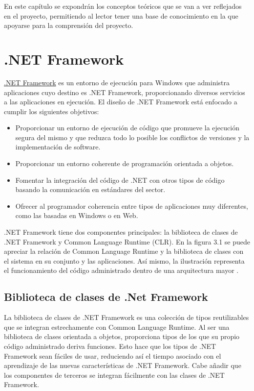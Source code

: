 
En este capítulo se expondrán los conceptos teóricos que se van a ver reflejados en el proyecto, permitiendo al lector tener una base de conocimiento en la que apoyarse para la comprensión del proyecto.

\section{.NET Framework}

\href{https://dotnet.microsoft.com/}{.NET Framework} es un entorno de ejecución para Windows que administra aplicaciones cuyo destino es .NET Framework, proporcionando diversos servicios a las aplicaciones en ejecución. El diseño de .NET Framework está enfocado a cumplir los siguientes objetivos:
\begin{itemize}
	\item Proporcionar un entorno de ejecución de código que promueve la ejecución segura del mismo y que reduzca todo lo posible los conflictos de versiones y la implementación de software.
	\item Proporcionar un entorno coherente de programación orientada a objetos.
	\item Fomentar la integración del código de .NET con otros tipos de código basando la comunicación en estándares del sector.
	\item Ofrecer al programador coherencia entre tipos de aplicaciones muy diferentes, como las basadas en Windows o en Web.
\end{itemize}

.NET Framework tiene dos componentes principales: la biblioteca de clases de .NET Framework y Common Language Runtime (CLR). En la figura 3.1 se puede apreciar la relación de Common Language Runtime y la biblioteca de clases con el sistema en su conjunto y las aplicaciones. Así mismo, la ilustración representa el funcionamiento del código administrado dentro de una arquitectura mayor \cite{web:01docNet}.


\subsection{Biblioteca de clases de .Net Framework}

La biblioteca de clases de .NET Framework es una colección de tipos reutilizables que se integran estrechamente con Common Language Runtime. Al ser una biblioteca de clases orientada a objetos, proporciona tipos de los que su propio código administrado deriva funciones. Esto hace que los tipos de .NET Framework sean fáciles de usar, reduciendo así el tiempo asociado con el aprendizaje de las nuevas características de .NET Framework. Cabe añadir que los componentes de terceros se integran fácilmente con las clases de .NET Framework.

